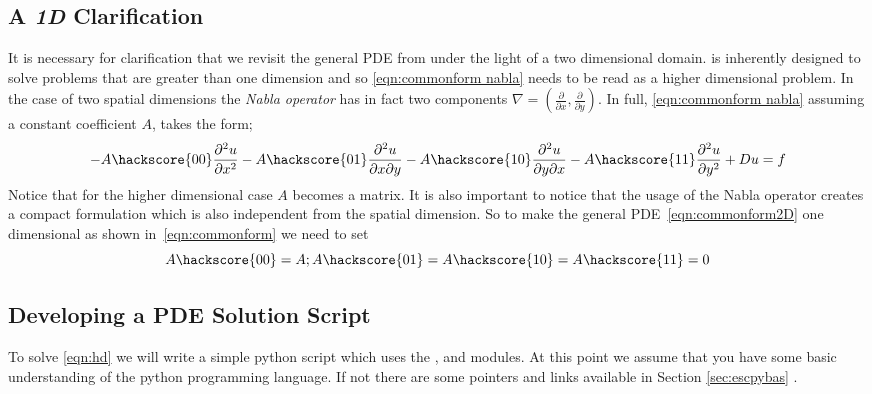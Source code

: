 \subsection{A \textit{1D} Clarification}
It is necessary for clarification that we revisit the general PDE from  under the light of a two dimensional domain. \ESCRIPT is inherently designed to solve problems that are greater than one dimension and so \ref{eqn:commonform nabla} needs to be read as a higher dimensional problem. In the case of two spatial dimensions the \textit{Nabla operator} has in fact two components $\nabla = (\frac{\partial}{\partial x}, \frac{\partial}{\partial y})$. In full, \ref{eqn:commonform nabla} assuming a constant coefficient $A$, takes the form;
\begin{equation}\label{eqn:commonform2D}
-A\hackscore{00}\frac{\partial^{2}u}{\partial x^{2}} 
-A\hackscore{01}\frac{\partial^{2}u}{\partial x\partial y} 
-A\hackscore{10}\frac{\partial^{2}u}{\partial y\partial x} 
-A\hackscore{11}\frac{\partial^{2}u}{\partial y^{2}} 
+ Du = f
\end{equation}
Notice that for the higher dimensional case $A$ becomes a matrix. It is also
important to notice that the usage of the Nabla operator creates
a compact formulation which is also independent from the spatial dimension. 
So to make the general PDE~\ref{eqn:commonform2D} one dimensional as
shown in~\ref{eqn:commonform} we need to set
\begin{equation}
A\hackscore{00}=A; A\hackscore{01}=A\hackscore{10}=A\hackscore{11}=0
\end{equation}

\subsection{Developing a PDE Solution Script}
To solve \ref{eqn:hd} we will write a simple python script which uses the \modescript, \modfinley and \modmpl modules. At this point we assume that you have some basic understanding of the python programming language. If not there are some pointers and links available in Section \ref{sec:escpybas} .

